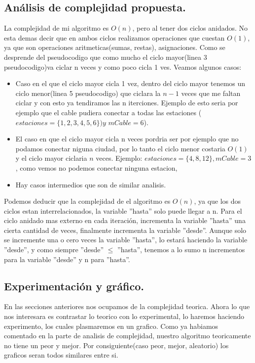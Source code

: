\subsection{Análisis de complejidad propuesta.}
La complejidad de mi algoritmo es $O(n)$, pero al tener dos ciclos anidados. No esta demas decir que  en ambos ciclos realizamos operaciones que cuestan $O(1)$,  ya que son operaciones aritmeticas(sumas, restas), asignaciones.
Como se desprende del pseudocodigo que como mucho el ciclo mayor(linea 3 pseudocodigo)va ciclar n veces y como poco cicla 1 ves.
 Veamos algunos casos:  
 \begin{itemize}
    \item Caso en el que el ciclo mayor cicla 1 vez, dentro del ciclo mayor tenemos un ciclo menor(linea 5 pseudocodigo) que ciclara la $n-1$ veces que me faltan ciclar y con esto ya tendiramos las n iterciones. Ejemplo de esto seria por ejemplo que el cable pudiera conectar a todas las estaciones ($estaciones=\{1,2,3,4,5,6\})y$ $mCable= 6$).
    \item El caso en que el ciclo mayor cicla n veces pordria ser por ejemplo que no podamos conectar niguna ciudad, por lo tanto el ciclo menor costaria $O(1)$ y el ciclo mayor ciclaria $n$ veces. Ejemplo: $estaciones = \{4,8,12\}, mCable = 3$, como vemos no podemos conectar ninguna estacion,
    \item Hay casos intermedios que son de  similar analisis.
\end{itemize}

Podemos deducir que la complejidad de el algoritmo es $O(n)$, ya que los dos ciclos estan interrelacionados, la variable ''hasta'' solo puede llegar a n. Para el ciclo anidado mas externo en cada iteración, incrementa la variable ''hasta'' una cierta cantidad de veces, finalmente incrementa la variable ''desde''. Aunque solo se incremente una o cero veces la variable ''hasta'', lo estará haciendo la variable ''desde'', y como siempre ''desde'' $ \leq $ ''hasta'', tenemos a lo sumo n incrementos para la variable ''desde'' y n para ''hasta''.
 

\subsection{Experimentación y gráfico.}

\vspace*{0.3cm}
En las secciones anteriores nos ocupamos de la complejidad teorica.
Ahora lo que nos interesara  es contrastar lo teorico con lo experimental, lo haremos haciendo experimento, los cuales plasmaremos en un grafico. 
Como ya habiamos comentado en la parte de analisis de complejidad, nuestro algoritmo teoricamente no tiene un peor y mejor. Por consiguiente(caso peor, mejor, aleatorio) los graficos seran todos similares entre si.   

